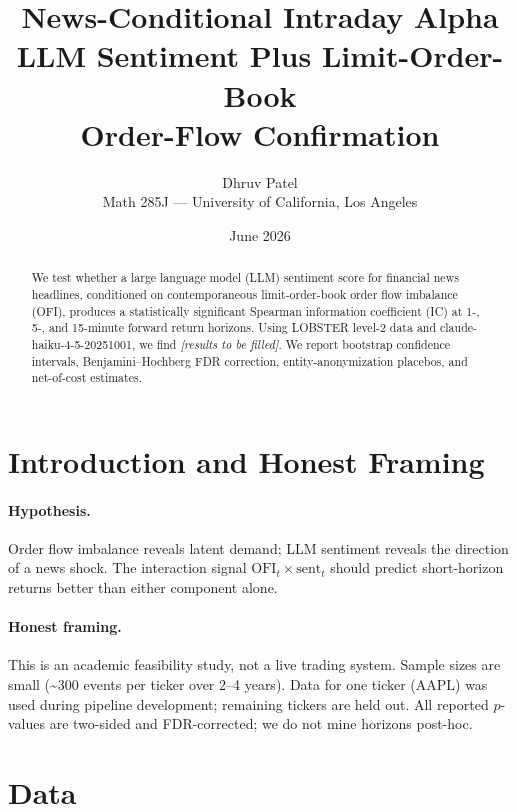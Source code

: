 \documentclass[12pt, letterpaper]{article}
\title{%
    \textbf{News-Conditional Intraday Alpha}\\[0.5em]
    \large LLM Sentiment Plus Limit-Order-Book\\
    Order-Flow Confirmation
}
\author{Dhruv Patel\\[0.3em]
    \small Math 285J — University of California, Los Angeles}
\date{June 2026}
\begin{document}
\maketitle
\begin{abstract}
We test whether a large language model (LLM) sentiment score for financial
news headlines, conditioned on contemporaneous limit-order-book order flow
imbalance (OFI), produces a statistically significant Spearman information
coefficient (IC) at 1-, 5-, and 15-minute forward return horizons.
Using LOBSTER level-2 data and claude-haiku-4-5-20251001, we find
\textit{[results to be filled]}.
We report bootstrap confidence intervals, Benjamini--Hochberg FDR correction,
entity-anonymization placebos, and net-of-cost estimates.
\end{abstract}

\tableofcontents
\newpage


\section{Introduction and Honest Framing}
\label{sec:intro}

\paragraph{Hypothesis.}
Order flow imbalance reveals latent demand; LLM sentiment reveals the
direction of a news shock.  The interaction signal $\text{OFI}_t \times
\text{sent}_t$ should predict short-horizon returns better than either
component alone.

\paragraph{Honest framing.}
This is an academic feasibility study, not a live trading system.
Sample sizes are small (\textasciitilde{}300 events per ticker over 2--4
years).  Data for one ticker (AAPL) was used during pipeline development;
remaining tickers are held out.  All reported $p$-values are two-sided
and FDR-corrected; we do not mine horizons post-hoc.



\section{Data}
\label{sec:data}
\end{document}
